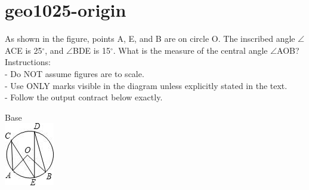 \documentclass[12pt]{article}
\begin{document}
\section*{geo1025-origin}
\noindent\begin{minipage}{\textwidth}
\setlength{\parskip}{4pt}
As shown in the figure, points A, E, and B are on circle O. The inscribed angle \ensuremath{\angle }ACE is 25\ensuremath{^\circ}, and \ensuremath{\angle }BDE is 15\ensuremath{^\circ}. What is the measure of the central angle \ensuremath{\angle }AOB?\\
Instructions:\\
- Do NOT assume figures are to scale.\\
- Use ONLY marks visible in the diagram unless explicitly stated in the text.\\
- Follow the output contract below exactly.\\
\end{minipage}
\begin{center}
\begin{minipage}{0.32\textwidth}\centering
Base\\
\includegraphics[width=0.95\linewidth]{out_rommath_origin/items/geo1025-origin/assets/figure.png}
\end{minipage}
\par
\end{center}
\bigskip
\end{document}
